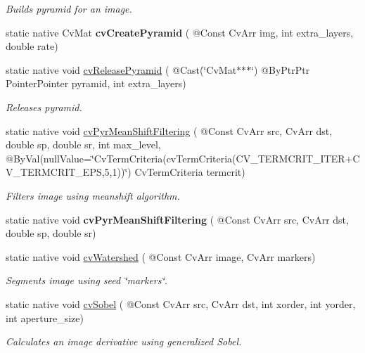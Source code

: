\begin{DoxyCompactItemize}
\begin{DoxyCompactList}\small\item\em Builds pyramid for an image. \end{DoxyCompactList}\item 
static native Cv\+Mat {\bfseries cv\+Create\+Pyramid} ( @Const Cv\+Arr img, int extra\+\_\+layers, double rate)
\item 
static native void \hyperlink{group__imgproc__c_gafedcfec1793dc4d6dd6e5c97d4fb30a0}{cv\+Release\+Pyramid} ( @Cast(\char`\"{}Cv\+Mat$\ast$$\ast$$\ast$\char`\"{}) @By\+Ptr\+Ptr Pointer\+Pointer pyramid, int extra\+\_\+layers)
\begin{DoxyCompactList}\small\item\em Releases pyramid. \end{DoxyCompactList}\item 
static native void \hyperlink{group__imgproc__c_ga03ca86df80599c20db2980fb4a3eeed2}{cv\+Pyr\+Mean\+Shift\+Filtering} ( @Const Cv\+Arr src, Cv\+Arr dst, double sp, double sr, int max\+\_\+level, @By\+Val(null\+Value=\char`\"{}Cv\+Term\+Criteria(cv\+Term\+Criteria(C\+V\+\_\+\+T\+E\+R\+M\+C\+R\+I\+T\+\_\+\+I\+T\+ER+C\+V\+\_\+\+T\+E\+R\+M\+C\+R\+I\+T\+\_\+\+E\+PS,5,1))\char`\"{}) Cv\+Term\+Criteria termcrit)
\begin{DoxyCompactList}\small\item\em Filters image using meanshift algorithm. \end{DoxyCompactList}\item 
static native void {\bfseries cv\+Pyr\+Mean\+Shift\+Filtering} ( @Const Cv\+Arr src, Cv\+Arr dst, double sp, double sr)
\item 
static native void \hyperlink{group__imgproc__c_gae7b6a113cdd9df18a224597d7e034810}{cv\+Watershed} ( @Const Cv\+Arr image, Cv\+Arr markers)
\begin{DoxyCompactList}\small\item\em Segments image using seed \char`\"{}markers\char`\"{}. \end{DoxyCompactList}\item 
static native void \hyperlink{group__imgproc__c_ga8ef9469a1ca3c2940511a7f390eb6fb3}{cv\+Sobel} ( @Const Cv\+Arr src, Cv\+Arr dst, int xorder, int yorder, int aperture\+\_\+size)
\begin{DoxyCompactList}\small\item\em Calculates an image derivative using generalized Sobel. \end{DoxyCompactList}\item 

\end{DoxyCompactItemize}
